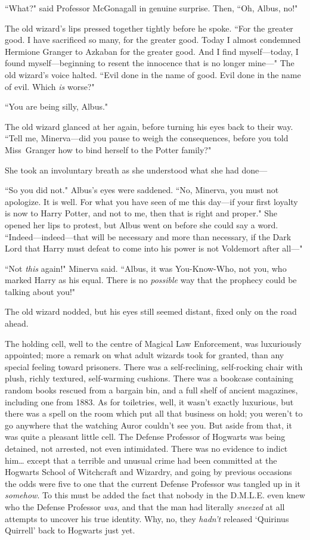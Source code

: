``What?" said Professor McGonagall in genuine surprise. Then, ``Oh, Albus, no!"

The old wizard's lips pressed together tightly before he spoke. ``For the greater good. I have sacrificed so many, for the greater good. Today I almost condemned Hermione Granger to Azkaban for the greater good. And I find myself—today, I found myself—beginning to resent the innocence that is no longer mine—" The old wizard's voice halted. ``Evil done in the name of good. Evil done in the name of evil. Which \emph{is} worse?"

``You are being silly, Albus."

The old wizard glanced at her again, before turning his eyes back to their way. ``Tell me, Minerva—did you pause to weigh the consequences, before you told Miss~Granger how to bind herself to the Potter family?"

She took an involuntary breath as she understood what she had done—

``So you did not." Albus's eyes were saddened. ``No, Minerva, you must not apologize. It is well. For what you have seen of me this day—if your first loyalty is now to Harry Potter, and not to me, then that is right and proper." She opened her lips to protest, but Albus went on before she could say a word. ``Indeed—indeed—that will be necessary and more than necessary, if the Dark Lord that Harry must defeat to come into his power is not Voldemort after all—"

``Not \emph{this} again!" Minerva said. ``Albus, it was You-Know-Who, not you, who marked Harry as his equal. There is no \emph{possible} way that the prophecy could be talking about you!"

The old wizard nodded, but his eyes still seemed distant, fixed only on the road ahead.

\later

The holding cell, well to the centre of Magical Law Enforcement, was luxuriously appointed; more a remark on what adult wizards took for granted, than any special feeling toward prisoners. There was a self-reclining, self-rocking chair with plush, richly textured, self-warming cushions. There was a bookcase containing random books rescued from a bargain bin, and a full shelf of ancient magazines, including one from 1883. As for toiletries, well, it wasn't exactly luxurious, but there was a spell on the room which put all that business on hold; you weren't to go anywhere that the watching Auror couldn't see you. But aside from that, it was quite a pleasant little cell. The Defense Professor of Hogwarts was being detained, not arrested, not even intimidated. There was no evidence to indict him{\ldots} except that a terrible and unusual crime had been committed at the Hogwarts School of Witchcraft and Wizardry, and going by previous occasions the odds were five to one that the current Defense Professor was tangled up in it \emph{somehow}. To this must be added the fact that nobody in the D.M.L.E. even knew who the Defense Professor \emph{was}, and that the man had literally \emph{sneezed} at all attempts to uncover his true identity. Why, no, they \emph{hadn't} released `Quirinus Quirrell' back to Hogwarts just yet.

